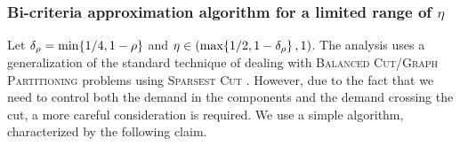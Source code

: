 \subsubsection{Bi-criteria approximation algorithm for a limited range of $\eta$}
Let $
\delta_{\rho}=\min\mathopen{}\left\{ 1/4,1-\rho \right\}$ and $
\eta\in\mathopen{}\left( \max\mathopen{}\left\{ 1/2,1-\delta_{\rho} \right\},1 \right)$.
The analysis uses a generalization of the standard technique of dealing with \textsc{Balanced Cut}/\textsc{Graph Partitioning} problems using \textsc{Sparsest Cut} \cite{ImprovedApproximationAlgorithmsForMinimumWeightVertexSeparators,MulticommodityMaxFlowMinCutTheoremsAndTheirUseInDesigningApproximationAlgorithms}. However, due to the fact that we need to control both the demand in the components and the demand crossing the cut, a more careful consideration is required. We use a simple algorithm, characterized by the following claim.

